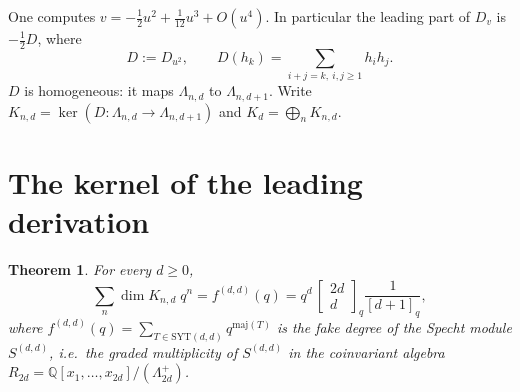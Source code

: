 \documentclass[11pt]{article}
\newtheorem{theorem}{Theorem}
\theoremstyle{definition}
\theoremstyle{remark}
\newcommand{\Q}{\mathbb{Q}}
\newcommand{\La}{\Lambda}
\newcommand{\qbin}[2]{\begin{bmatrix}#1\\#2\end{bmatrix}_q}
\begin{document}
One computes $v=-\tfrac12u^2+\tfrac1{12}u^3+O(u^4)$. In particular the leading part of $D_v$ is $-\frac12D$, where
\[
  D:=D_{u^2},\qquad D(h_k)=\sum_{i+j=k,\ i,j\ge1}h_ih_j .
\]
$D$ is homogeneous: it maps $\La_{n,d}$ to $\La_{n,d+1}$. Write $K_{n,d}=\ker(D\colon\La_{n,d}\to\La_{n,d+1})$ and
$K_d=\bigoplus_nK_{n,d}$.

\section{The kernel of the leading derivation}\label{sec:thmC}

\begin{theorem}\label{thmC}
For every $d\ge0$,
\[
  \sum_n\dim K_{n,d}\;q^n=f^{(d,d)}(q)=q^d\,\qbin{2d}{d}\frac{1}{[d+1]_q},
\]
where $f^{(d,d)}(q)=\sum_{T\in\mathrm{SYT}(d,d)}q^{\mathrm{maj}(T)}$ is the fake degree of the Specht module
$S^{(d,d)}$, i.e.\ the graded multiplicity of $S^{(d,d)}$ in the coinvariant algebra
$R_{2d}=\Q[x_1,\dots,x_{2d}]/(\La^+_{2d})$.
\end{theorem}
\end{document}
